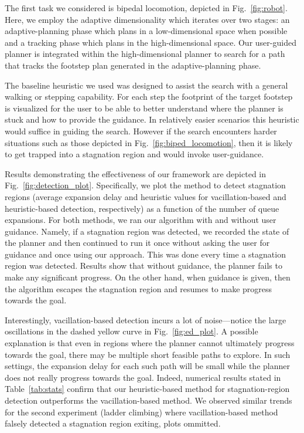 \documentclass{article}
\begin{document}

The first task we considered is bipedal locomotion, depicted in Fig.~\ref{fig:robot}.
Here, we employ the adaptive dimensionality 
which iterates over two stages: an adaptive-planning phase which plans in a low-dimensional space when possible and a tracking phase which plans in the high-dimensional space.
Our user-guided planner is integrated within the high-dimensional planner to search for a path that tracks the footstep plan generated in the adaptive-planning  phase. 

The baseline heuristic we used was designed to assist the search with a general walking or stepping capability. For each step the footprint of the target footstep is visualized for the user to be able to better understand where the planner is stuck and how to provide the guidance. In relatively easier scenarios this heuristic would suffice in guiding the search. However if the search encounters harder situations such as those depicted in Fig.~\ref{fig:biped_locomotion}, then it is likely to get trapped into a stagnation region and would invoke user-guidance.

Results demonstrating the effectiveness of our framework are depicted in Fig.~\ref{fig:detection_plot}.
Specifically, we plot the 
method to detect stagnation regions (average expansion delay and heuristic values for vacillation-based and heuristic-based detection, respectively) as a function of the number of queue expansions.
For both methods, we ran our algorithm with and without user guidance.
Namely, if a stagnation region was detected, we recorded the state of the planner and then continued to run it once without asking the user for guidance and once using our approach. This was done every time a stagnation region was detected. 
Results show that without guidance, the planner fails to make any significant progress.
On the other hand, when guidance is given, then the algorithm escapes the stagnation region and resumes to make progress towards the goal.

Interestingly, vacillation-based detection incurs a lot of noise---notice the large oscillations in the dashed yellow curve in Fig.~\ref{fig:ed_plot}. 
A possible explanation is that even in regions where the planner cannot ultimately progress towards the goal, there may be multiple short feasible paths to explore. In such settings, the expansion delay for each such path will be small while the planner does not really progress towards the goal.
Indeed, numerical results stated in Table~\ref{tab:stats} confirm that our heuristic-based method for stagnation-region detection outperforms the vacillation-based method.
We observed similar trends for the second experiment (ladder climbing) where vacillation-based method falsely detected a stagnation region exiting, plots ommitted.
\end{document}
